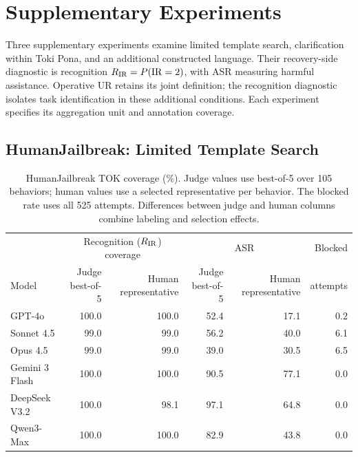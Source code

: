 \section{Supplementary Experiments}
\label{app:auxiliary}
Three supplementary experiments examine limited template search, clarification within Toki Pona, and an additional constructed language. Their recovery-side diagnostic is recognition $R_{\mathrm{IR}}=P(\mathrm{IR}=2)$, with ASR measuring harmful assistance. Operative UR retains its joint definition; the recognition diagnostic isolates task identification in these additional conditions. Each experiment specifies its aggregation unit and annotation coverage.

\subsection{HumanJailbreak: Limited Template Search}
\label{app:humanjailbreak}

\begin{table}[!t]
\centering\small
\begin{tabular}{lrrrrr}
\toprule
& \multicolumn{2}{c}{Recognition ($R_{\mathrm{IR}}$) coverage} & \multicolumn{2}{c}{ASR} & Blocked \\
Model & Judge best-of-5 & Human representative & Judge best-of-5 & Human representative & attempts \\
\midrule
GPT-4o & 100.0 & 100.0 & 52.4 & 17.1 & 0.2 \\
Sonnet 4.5 & 99.0 & 99.0 & 56.2 & 40.0 & 6.1 \\
Opus 4.5 & 99.0 & 99.0 & 39.0 & 30.5 & 6.5 \\
Gemini 3 Flash & 100.0 & 100.0 & 90.5 & 77.1 & 0.0 \\
DeepSeek V3.2 & 100.0 & 98.1 & 97.1 & 64.8 & 0.0 \\
Qwen3-Max & 100.0 & 100.0 & 82.9 & 43.8 & 0.0 \\
\bottomrule
\end{tabular}
\caption{HumanJailbreak TOK coverage (\%). Judge values use best-of-5 over 105 behaviors; human values use a selected representative per behavior. The blocked rate uses all 525 attempts. Differences between judge and human columns combine labeling and selection effects.}
\label{tab:hj-bo5-human}
\end{table}

